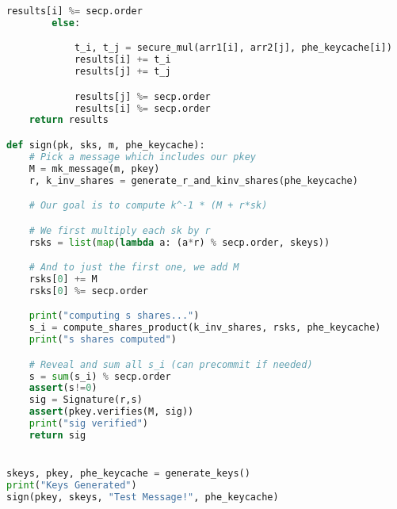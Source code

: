 \documentclass{article}
\begin{document}
\begin{lstlisting}[language=Python]
            results[i] %= secp.order
        else:

            t_i, t_j = secure_mul(arr1[i], arr2[j], phe_keycache[i])
            results[i] += t_i
            results[j] += t_j

            results[j] %= secp.order
            results[i] %= secp.order
    return results

def sign(pk, sks, m, phe_keycache):
    # Pick a message which includes our pkey
    M = mk_message(m, pkey)
    r, k_inv_shares = generate_r_and_kinv_shares(phe_keycache)

    # Our goal is to compute k^-1 * (M + r*sk)

    # We first multiply each sk by r
    rsks = list(map(lambda a: (a*r) % secp.order, skeys))

    # And to just the first one, we add M
    rsks[0] += M
    rsks[0] %= secp.order

    print("computing s shares...")
    s_i = compute_shares_product(k_inv_shares, rsks, phe_keycache)
    print("s shares computed")

    # Reveal and sum all s_i (can precommit if needed)
    s = sum(s_i) % secp.order
    assert(s!=0)
    sig = Signature(r,s)
    assert(pkey.verifies(M, sig))
    print("sig verified")
    return sig


skeys, pkey, phe_keycache = generate_keys()
print("Keys Generated")
sign(pkey, skeys, "Test Message!", phe_keycache)


\end{lstlisting}
\end{document}
